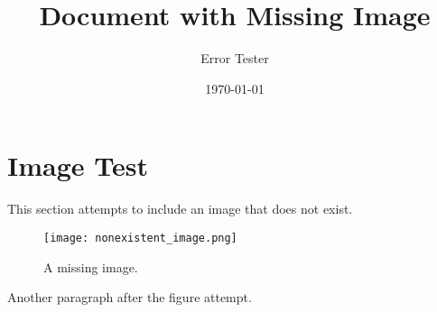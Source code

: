 \documentclass{article}
\title{Document with Missing Image}
\author{Error Tester}
\date{\today}
\begin{document}
\maketitle

\section{Image Test}
This section attempts to include an image that does not exist.

\begin{figure}[h!]
    \centering
    \texttt{[image: nonexistent\_image.png]}
    \caption{A missing image.}
    \label{fig:missing}
\end{figure}

Another paragraph after the figure attempt.
\end{document}
